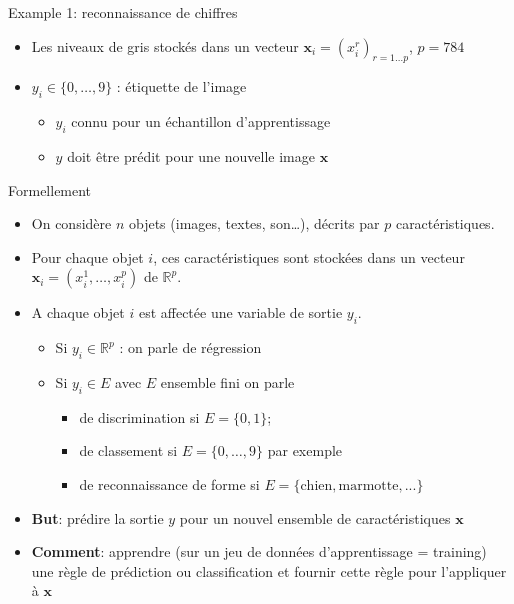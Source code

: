 \documentclass[ignorenonframetext,]{beamer}
\providecommand{\tightlist}{%
  \setlength{\itemsep}{0pt}\setlength{\parskip}{0pt}}
\begin{document}
\begin{frame}{Example 1: reconnaissance de chiffres}

\begin{itemize}
\item
  Les niveaux de gris stockés dans un vecteur
  \(\mathbf{x}_i = (x_i^r)_{r=1\dots p}\), \(p=784\)
\item
  \(y_i \in \{0,\dots, 9\}\) : étiquette de l'image

  \begin{itemize}
  \tightlist
  \item
    \(y_i\) connu pour un échantillon d'apprentissage
  \item
    \(y\) doit être prédit pour une nouvelle image \(\mathbf{x}\)
  \end{itemize}
\end{itemize}

\end{frame}

\begin{frame}{Formellement}

\begin{itemize}
\item
  On considère \(n\) objets (images, textes, son\ldots{}), décrits par
  \(p\) caractéristiques.
\item
  Pour chaque objet \(i\), ces caractéristiques sont stockées dans un
  vecteur \(\mathbf{x}_i = (x_i^1, \dots, x_i^p)\) de \(\mathbb{R}^p\).
\item
  A chaque objet \(i\) est affectée une variable de sortie \(y_i\).

  \begin{itemize}
  \tightlist
  \item
    Si \(y_i \in \mathbb{R}^p\) : on parle de régression
  \item
    Si \(y_i \in E\) avec \(E\) ensemble fini on parle

    \begin{itemize}
    \tightlist
    \item
      de discrimination si \(E = \{0,1\}\);
    \item
      de classement si \(E=\{0,\dots, 9\}\) par exemple
    \item
      de reconnaissance de forme si
      \(E=\{\text{chien},\text{marmotte},...\}\)
    \end{itemize}
  \end{itemize}
\item
  \textbf{But}: prédire la sortie \(y\) pour un nouvel ensemble de
  caractéristiques \(\mathbf{x}\)
\item
  \textbf{Comment}: apprendre (sur un jeu de données d'apprentissage =
  training) une règle de prédiction ou classification et fournir cette
  règle pour l'appliquer à \(\mathbf{x}\)
\end{itemize}

\end{frame}
\end{document}
